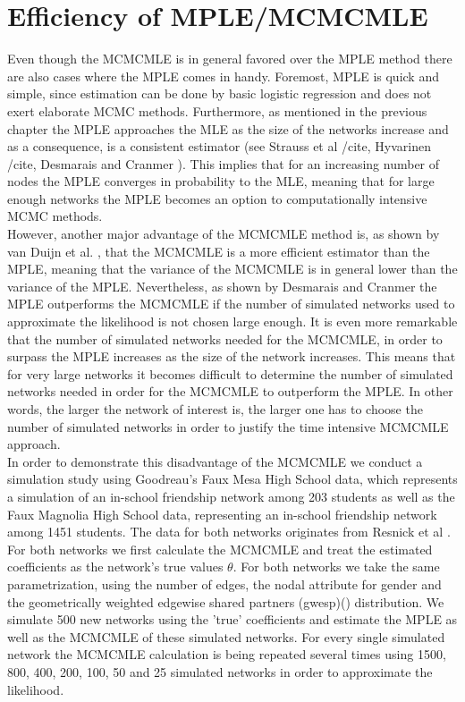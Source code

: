 \documentclass[headsepline=true, abstracton]{scrartcl}
\begin{document}
\section*{Efficiency of MPLE/MCMCMLE}
Even though the MCMCMLE is in general favored over the MPLE method there are also cases where the MPLE comes in handy. Foremost, MPLE is quick and simple, since estimation can be done by basic logistic regression and does not exert elaborate MCMC methods. Furthermore, as mentioned in the previous chapter the MPLE approaches the MLE as the size of the networks increase and as a consequence, is a consistent estimator (see Strauss et al /cite, Hyvarinen /cite, Desmarais and Cranmer \cite{Desmarais.2012}). This implies that for an increasing number of nodes the MPLE converges in probability to the MLE, meaning that for large enough networks the MPLE becomes an option to computationally intensive MCMC methods.\\
However, another major advantage of the MCMCMLE method is, as shown by van Duijn et al. \cite{vanDuijn.2009}, that the MCMCMLE is a more efficient estimator than the MPLE, meaning that the variance of the MCMCMLE is in general lower than the variance of the MPLE. Nevertheless, as shown by Desmarais and Cranmer \cite{Desmarais.2012} the MPLE outperforms the MCMCMLE if the number of simulated networks used to approximate the likelihood is not chosen large enough. It is even more remarkable that the number of simulated networks needed for the MCMCMLE, in order to surpass the MPLE increases as the size of the network increases. This means that for very large networks it becomes difficult to determine the number of simulated networks needed in order for the MCMCMLE to outperform the MPLE. In other words, the larger the network of interest is, the larger one has to choose the number of simulated networks in order to justify the time intensive MCMCMLE approach.\\[0.3cm]
\noindent In order to demonstrate this disadvantage of the MCMCMLE we conduct a simulation study using Goodreau's Faux Mesa High School data, which represents a simulation of an in-school friendship network among 203 students as well as the Faux Magnolia High School data, representing an in-school friendship network among 1451 students. The data for both networks originates from Resnick et al \cite{Resnicketal1997}.\\[0.3cm]
For both networks we first calculate the MCMCMLE and treat the estimated coefficients as the network's true values $\theta$. For both networks we take the same parametrization, using the number of edges, the nodal attribute for gender and the geometrically weighted edgewise shared partners (gwesp)(\cite{Hunter.2006}) distribution. We simulate 500 new networks using the 'true' coefficients and estimate the MPLE as well as the MCMCMLE of these simulated networks. For every single simulated network the MCMCMLE calculation is being repeated several times using 1500, 800, 400, 200, 100, 50 and 25 simulated networks in order to approximate the likelihood.
\end{document}

